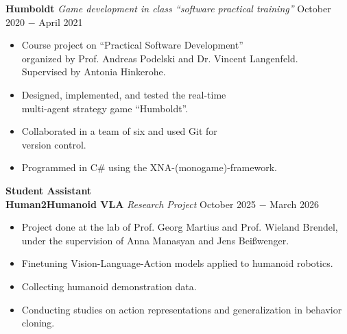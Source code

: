 \documentclass{article}
\begin{document}
\noindent \textbf{Humboldt} \textit{Game development in class ``software practical training''} \hfill  October 2020 $-$ April 2021
\begin{itemize}[noitemsep,nolistsep,leftmargin=*]
    \item Course project on ``Practical Software Development'' \\
    organized by Prof. Andreas Podelski and Dr. Vincent Langenfeld. \\
    Supervised by Antonia Hinkerohe.
    \item Designed, implemented, and tested the real-time \\
    multi-agent strategy game ``Humboldt''.
    \item Collaborated in a team of six and used Git for \\ 
    version control.
    \item Programmed in C\# using the XNA-(monogame)-framework. \\
\end{itemize}



\vspace{0.5cm}
\textbf{Student Assistant} \\

\noindent \textbf{Human2Humanoid VLA} \textit{Research Project} \hfill October 2025 $-$ March 2026
\begin{itemize}[noitemsep,nolistsep,leftmargin=*]
    \item Project done at the lab of Prof. Georg Martius and Prof. Wieland Brendel, \\
    under the supervision of Anna Manasyan and Jens Beißwenger.
    \item Finetuning Vision-Language-Action models applied to humanoid robotics.
    \item Collecting humanoid demonstration data. 
    \item Conducting studies on action representations and generalization in behavior cloning.\\
\end{itemize}
\end{document}
